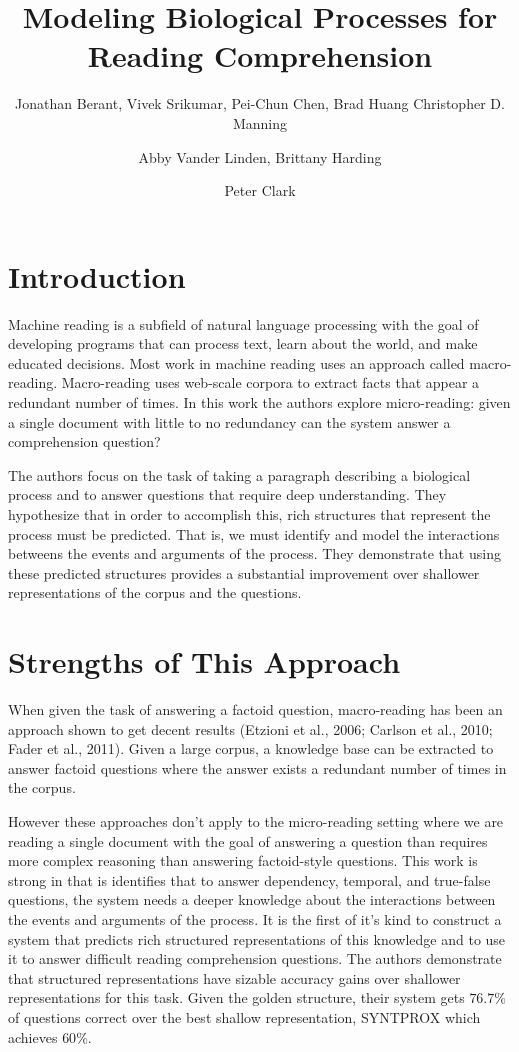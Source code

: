 \documentclass[fleqn,11pt]{wlpeerj} %
\title{Modeling Biological Processes for Reading Comprehension}
\author[]{Jonathan Berant, Vivek Srikumar, Pei-Chun Chen, Brad Huang Christopher D. Manning}
\affil[]{Stanford University, Stanford}
\author[]{Abby Vander Linden, Brittany Harding}
\affil[]{University of Washington, Seattle}
\author[]{Peter Clark}
\affil[]{Allen Institute for Artificial Intelligence, Seattle}
\begin{document}
\flushbottom
\maketitle
\thispagestyle{empty}

\section*{Introduction}

Machine reading is a subfield of natural language processing with the goal of developing programs that can process text, learn about the world, and make educated decisions. Most work in machine reading uses an approach called macro-reading. Macro-reading uses web-scale corpora to extract facts that appear a redundant number of times. In this work the authors explore micro-reading: given a single document with little to no redundancy can the system answer a comprehension question? 

The authors focus on the task of taking a paragraph describing a biological process and to answer questions that require deep understanding. They hypothesize that in order to accomplish this, rich structures that represent the process must be predicted. That is, we must identify and model the interactions betweens the events and arguments of the process. They demonstrate that using these predicted structures provides a substantial improvement over shallower representations of the corpus and the questions. 

\section*{Strengths of This Approach}

When given the task of answering a factoid question, macro-reading has been an approach shown to get decent results (Etzioni et al., 2006; Carlson et al., 2010; Fader et al., 2011). Given a large corpus, a knowledge base can be extracted to answer factoid questions where the answer exists a redundant number of times in the corpus. 

However these approaches don't apply to the micro-reading setting where we are reading a single document with the goal of answering a question than requires more complex reasoning than answering factoid-style questions. This work is strong in that is identifies that to answer dependency, temporal, and true-false questions, the system needs a deeper knowledge about the interactions between the events and arguments of the process. It is the first of it's kind to construct a system that predicts rich structured representations of this knowledge and to use it to answer  difficult reading comprehension questions. The authors demonstrate that structured representations have sizable accuracy gains over shallower representations for this task. Given the golden structure, their system gets $76.7\%$ of questions correct over the best shallow representation, SYNTPROX which achieves $60\%$.
\end{document}
